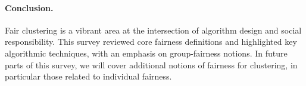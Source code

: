 \documentclass[11pt]{article}
\begin{document}









\paragraph{Conclusion.}
Fair clustering is a vibrant area at the intersection of algorithm design and social responsibility. This survey reviewed core fairness definitions and highlighted key algorithmic techniques, with an emphasis on group-fairness notions. In future parts of this survey, we will cover additional notions of fairness for clustering, in particular those related to individual fairness.



\end{document}
